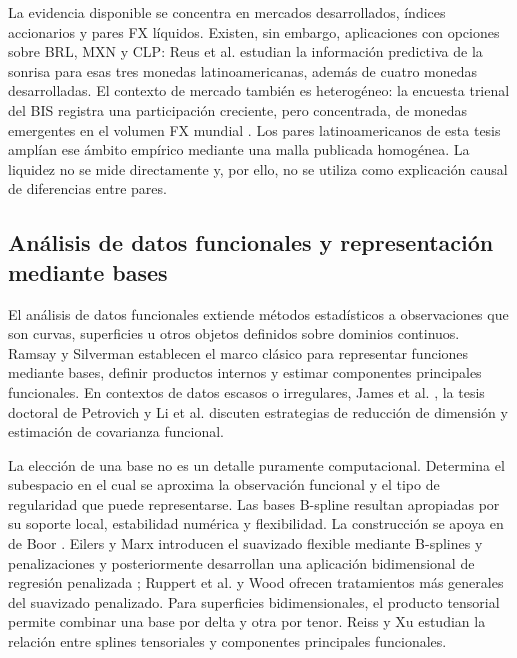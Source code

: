 \documentclass[a4paper,11pt]{article}
\begin{document}
La evidencia disponible se concentra en mercados desarrollados, índices accionarios y pares FX líquidos. Existen, sin embargo, aplicaciones con opciones sobre BRL, MXN y CLP: Reus et al. \cite{ReusCarrascoPincheira2020} estudian la información predictiva de la sonrisa para esas tres monedas latinoamericanas, además de cuatro monedas desarrolladas. El contexto de mercado también es heterogéneo: la encuesta trienal del BIS registra una participación creciente, pero concentrada, de monedas emergentes en el volumen FX mundial \cite{BIS2025}. Los pares latinoamericanos de esta tesis amplían ese ámbito empírico mediante una malla publicada homogénea. La liquidez no se mide directamente y, por ello, no se utiliza como explicación causal de diferencias entre pares.

\subsection{Análisis de datos funcionales y representación mediante bases}

El análisis de datos funcionales extiende métodos estadísticos a observaciones que son curvas, superficies u otros objetos definidos sobre dominios continuos. Ramsay y Silverman \cite{RamsaySilverman2005} establecen el marco clásico para representar funciones mediante bases, definir productos internos y estimar componentes principales funcionales. En contextos de datos escasos o irregulares, James et al. \cite{JamesHastieSugar2000}, la tesis doctoral de Petrovich \cite{Petrovich2018} y Li et al. \cite{Li2020} discuten estrategias de reducción de dimensión y estimación de covarianza funcional.

La elección de una base no es un detalle puramente computacional. Determina el subespacio en el cual se aproxima la observación funcional y el tipo de regularidad que puede representarse. Las bases B-spline resultan apropiadas por su soporte local, estabilidad numérica y flexibilidad. La construcción se apoya en de Boor \cite{DeBoor2001}. Eilers y Marx introducen el suavizado flexible mediante B-splines y penalizaciones \cite{EilersMarx1996} y posteriormente desarrollan una aplicación bidimensional de regresión penalizada \cite{EilersMarx2003}; Ruppert et al. \cite{Ruppert2003} y Wood \cite{Wood2017} ofrecen tratamientos más generales del suavizado penalizado. Para superficies bidimensionales, el producto tensorial permite combinar una base por delta y otra por tenor. Reiss y Xu \cite{ReissXu2020} estudian la relación entre splines tensoriales y componentes principales funcionales.
\end{document}
